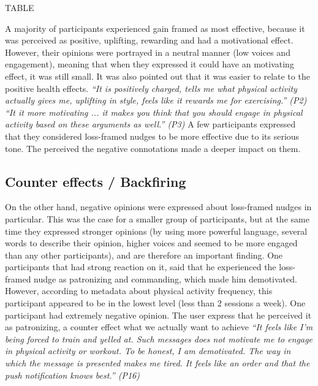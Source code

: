 TABLE

A majority of participants experienced gain framed as most effective, because it was perceived as positive, uplifting, rewarding and had a motivational effect. However, their opinions were portrayed in a neutral manner (low voices and engagement), meaning that when they expressed it could have an motivating effect, it was still small. It was also pointed out that it was easier to relate to the positive health effects.
\textit{“It is positively charged, tells me what physical activity actually gives me, uplifting in style, feels like it rewards me for exercising.” (P2)}
\textit{“It it more motivating ... it makes you think that you should engage in physical activity based on these arguments as well.” (P3)}
A few participants expressed that they considered loss-framed nudges to be more effective due to its serious tone. The perceived the negative connotations made a deeper impact on them. 

\subsection{Counter effects / Backfiring}
On the other hand, negative opinions were expressed about loss-framed nudges in particular. This was the case for a smaller group of participants, but at the same time they expressed stronger opinions (by using more powerful language, several words to describe their opinion, higher voices and seemed to be more engaged than any other participants), and are therefore an important finding. One participants that had strong reaction on it, said that he experienced the loss-framed nudge as patronizing and commanding, which made him demotivated. However, according to metadata about physical activity frequency, this participant appeared to be in the lowest level (less than 2 sessions a week). One participant had extremely negative opinion. The user express that he perceived it as patronizing, a counter effect what we actually want to achieve
\textit{“It feels like I'm being forced to train and yelled at. Such messages does not motivate me to engage in physical activity or workout. To be honest, I am demotivated. The way in which the message is presented makes me tired. It feels like an order and that the push notification knows best.” (P16)}


